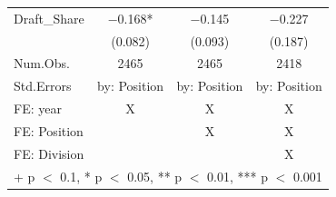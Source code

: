 \begin{table}
\centering
\begin{tabular}[t]{lccc}
\toprule
\midrule
Draft\_Share & \num{-0.168}* & \num{-0.145} & \num{-0.227}\\
 & (\num{0.082}) & (\num{0.093}) & (\num{0.187})\\
\midrule
Num.Obs. & \num{2465} & \num{2465} & \num{2418}\\
Std.Errors & by: Position & by: Position & by: Position\\
FE: year & X & X & X\\
FE: Position &  & X & X\\
FE: Division &  &  & X\\
\bottomrule
\multicolumn{4}{l}{\rule{0pt}{1em}+ p $<$ 0.1, * p $<$ 0.05, ** p $<$ 0.01, *** p $<$ 0.001}\\
\end{tabular}
\end{table}